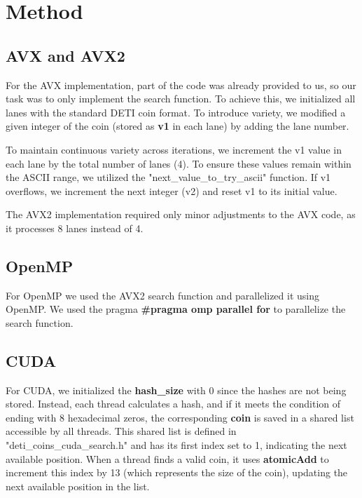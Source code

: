 \documentclass[a4paper,12pt]{article}
\begin{document}
\section{Method}
\label{sec:method}
\subsection{AVX and AVX2}
\label{subsec:avx}

For the AVX implementation, part of the code was already provided to us, so our task was to only implement the search function. To achieve this, we initialized all lanes with the standard DETI coin format. To introduce variety, we modified a given integer of the coin (stored as \textbf{v1} in each lane) by adding the lane number.

To maintain continuous variety across iterations, we increment the v1 value in each lane by the total number of lanes (4). To ensure these values remain within the ASCII range, we utilized the "next\_value\_to\_try\_ascii" function. If v1 overflows, we increment the next integer (v2) and reset v1 to its initial value.

The AVX2 implementation required only minor adjustments to the AVX code, as it processes 8 lanes instead of 4.


\subsection{OpenMP}
\label{subsec:openmp}

For OpenMP we used the AVX2 search function and parallelized it using OpenMP. We used the pragma \textbf{\#pragma omp parallel for} to parallelize the search function.

\subsection{CUDA}
\label{subsec:cuda}

For CUDA, we initialized the \textbf{hash\_size} with 0 since the hashes are not being stored. Instead, each thread calculates a hash, and if it meets the condition of ending with 8 hexadecimal zeros, the corresponding \textbf{coin} is saved in a shared list accessible by all threads. This shared list is defined in "deti\_coins\_cuda\_search.h" and has its first index set to 1, indicating the next available position. When a thread finds a valid coin, it uses \textbf{atomicAdd} to increment this index by 13 (which represents the size of the coin), updating the next available position in the list.
\end{document}
